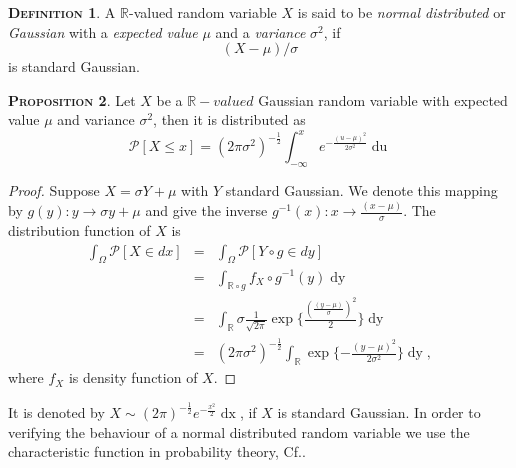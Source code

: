 \documentclass[a4paper, twoside, 11pt]{article}
\theoremstyle{definition}
\newtheorem{definition}{\scshape Definition}[section]
\newtheorem{proposition}[definition]{\scshape Proposition}
\begin{document}
\begin{definition}
  A $\mathbb{R}$-valued random variable $X$ is said to be \emph{normal distributed} or \emph{Gaussian} with a \emph{expected value} $\mu$ and a \emph{variance} $\sigma^2$, if
\[
  (X-\mu) / \sigma
\]
is standard Gaussian.
\end{definition}

\begin{proposition}
  Let $X$ be a $\mathbb{R}-valued$ Gaussian random variable with expected value $\mu$ and variance $\sigma^2$, then it is distributed as
  \begin{equation*}
	\mathcal{P}[X\le x] = (2\pi\sigma^2)^{-\frac{1}{2}}\int_{-\infty}^x e^{-\frac{(u-\mu)^2}{2\sigma^2}}\mathop{du}
  \end{equation*}
\end{proposition}

\begin{proof}
  Suppose $X = \sigma Y + \mu$ with $Y$ standard Gaussian. We denote this mapping by $g(y) : y \rightarrow \sigma y + \mu$ and give the inverse $g^{-1}(x) : x \rightarrow \frac{(x-\mu)}{\sigma}$. The distribution function of $X$ is 
  \begin{eqnarray*}
	\int_\Omega \mathcal{P}[X \in dx] &=& \int_\Omega \mathcal{P}[Y \circ g \in dy] \\
	&=& \int_{\mathbb{R}\circ g} f_X \circ g^{-1}(y) \mathop{dy}\\
	&=& \int_{\mathbb{R}} \sigma \frac{1}{\sqrt{2\pi}} \exp\{\frac{(\frac{(y-\mu)}{\sigma})^2}{2}\} \mathop{dy}\\
	&=&  (2\pi\sigma^2)^{-\frac{1}{2}}\int_{\mathbb{R}} \exp\{-\frac{(y-\mu)^2}{2\sigma^2}\}\mathop{dy} ,
  \end{eqnarray*}
 where $f_X$ is density function of $X$.
\end{proof}

It is denoted by $X \sim (2\pi)^{-\frac{1}{2}}e^{-\frac{x^2}{2}}\mathop{dx} $, if $X$ is standard Gaussian. In order to verifying the behaviour of a normal distributed random variable we use the characteristic function in probability theory, Cf.\cite{bauer}. 
\end{document}
